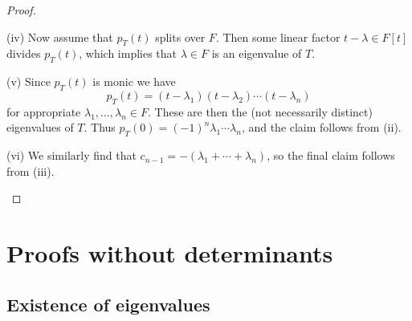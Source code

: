 \documentclass[article, a4paper, 11pt, oneside]{memoir}
\makeatletter
\numberwithin{equation}{chapter}
\newcommand{\calM}{\mathcal{M}}
\DeclareMathOperator{\spec}{Spec}
\newcommand{\mat@dims}[1]{%
    \readlist*\@dims{#1}%
    \ifnum \@dimslen=1
        \def\@dimsout{\@dims[1]}%
    \else
        \def\@dimsout{\@dims[1], \@dims[2]}%
    \fi
    \@dimsout
}
\newcommand{\mat}[2]{\calM_{\mat@dims{#1}}(#2)}
\makeatother
\begin{document}
\begin{proof}
\begin{proofsec}
    \item[(iv)]
    Now assume that $p_T(t)$ splits over $F$. Then some linear factor $t-\lambda \in F[t]$ divides $p_T(t)$, which implies that $\lambda \in F$ is an eigenvalue of $T$.
    
    \item[(v)]
    Since $p_T(t)$ is monic we have
    \begin{equation*}
        p_T(t)
            = (t - \lambda_1) (t - \lambda_2) \cdots (t - \lambda_n)
    \end{equation*}
    for appropriate $\lambda_1, \ldots, \lambda_n \in F$. These are then the (not necessarily distinct) eigenvalues of $T$. Thus $p_T(0) = (-1)^n \lambda_1 \cdots \lambda_n$, and the claim follows from (ii).

    \item[(vi)]
    We similarly find that $c_{n-1} = -(\lambda_1 + \cdots + \lambda_n)$, so the final claim follows from (iii).
\end{proofsec}
\end{proof}


\section{Proofs without determinants}

\subsection{Existence of eigenvalues}


\end{document}

